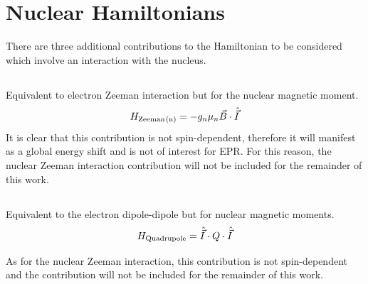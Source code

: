 \section{Nuclear Hamiltonians}\label{nuclear}
There are three additional contributions to the Hamiltonian to be considered which involve an interaction with the nucleus.

%
\subsection{}
Equivalent to electron Zeeman interaction but for the nuclear magnetic moment.\begin{equation}
	H_{\ce{Zeeman(n)}} = -g_n \mu_n \vec{B} \cdot \hat{\vec{I}}
	\label{eq:nuclear_zeeman_hamiltonian}
\end{equation}
 It is clear that this contribution is not spin-dependent, therefore it will manifest as a global energy shift and is not of interest for EPR. For this reason, the nuclear Zeeman interaction contribution will not be included for the remainder of this work. 

\subsection{}
Equivalent to the electron dipole-dipole but for nuclear magnetic moments.
\begin{equation}
	H_{\ce{Quadrupole}} = \hat{\vec{I}} \cdot Q \cdot \hat{\vec{I}}
	\label{eq:nuclear_quadrupole}
\end{equation}

 As for the nuclear Zeeman interaction, this contribution is not spin-dependent and the contribution will not be included for the remainder of this work. 

